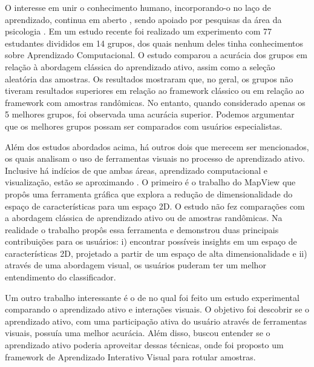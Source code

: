O interesse em unir o conhecimento humano, incorporando-o no laço de aprendizado, continua em aberto \citep{calma2016active}, sendo apoiado por pesquisas da área da psicologia \citep{sim2015children}. Em um estudo recente \citep{kottke2018other} foi realizado um experimento com 77 estudantes divididos em 14 grupos, dos quais nenhum deles tinha conhecimentos sobre Aprendizado Computacional. O estudo comparou a acurácia dos grupos em relação à abordagem clássica do aprendizado ativo, assim como a seleção aleatória das amostras. Os resultados mostraram que, no geral, os grupos não tiveram resultados superiores em relação ao framework clássico ou em relação ao framework com amostras randômicas. No entanto, quando considerado apenas os 5 melhores grupos, foi observada uma acurácia superior. Podemos argumentar que os melhores grupos possam ser comparados com usuários especialistas. 

Além dos estudos abordados acima, há outros dois que merecem ser mencionados, os quais analisam o uso de ferramentas visuais no processo de aprendizado ativo. Inclusive há indícios de que ambas áreas, aprendizado computacional e visualização, estão se aproximando \citep{sacha2016human}. O primeiro é o trabalho do MapView \citep{weigl2016mapview} que propôs uma ferramenta gráfica que explora a redução de dimensionalidade do espaço de características para um espaço 2D. O estudo não fez comparações com a abordagem clássica de aprendizado ativo ou de amostras randômicas. Na realidade o trabalho propôs essa ferramenta e demonstrou duas principais contribuições para os usuários: i) encontrar possíveis insights em um espaço de características 2D, projetado a partir de um espaço de alta dimensionalidade e ii) através de uma abordagem visual, os usuários puderam ter um melhor entendimento do classificador. 

Um outro trabalho interessante é o de \citep{bernard2018comparing} no qual foi feito um estudo experimental comparando o aprendizado ativo e interações visuais. O objetivo foi descobrir se o aprendizado ativo, com uma participação ativa do usuário através de ferramentas visuais, possuía uma melhor acurácia. Além disso, buscou entender se o aprendizado ativo poderia aproveitar dessas técnicas, onde foi proposto um framework de Aprendizado Interativo Visual para rotular amostras. 

